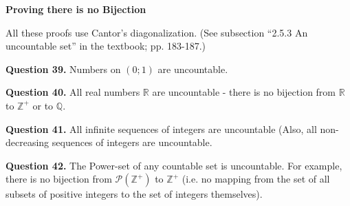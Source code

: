 \documentclass[jou]{apa6}
\begin{document}
\vspace{20pt}
{\bf Proving there is no Bijection}

All these proofs use Cantor's diagonalization. (See subsection 
``2.5.3 An uncountable set'' in the textbook; pp. 183-187.)

\vspace{6pt}
{\bf Question 39.} Numbers on $(0;1)$ are uncountable.


\vspace{6pt}
{\bf Question 40.}
 All real numbers $\mathbb{R}$ are uncountable - there 
is no bijection from $\mathbb{R}$ to $\mathbb{Z}^{+}$ or
to $\mathbb{Q}$. 


\vspace{6pt}
{\bf Question 41.} All infinite sequences of integers are uncountable
(Also, all non-decreasing sequences of integers are uncountable.


\vspace{6pt}
{\bf Question 42.} The Power-set of any countable set is 
uncountable. For example, 
there is no bijection from $\mathcal{P}(\mathbb{Z}^{+})$
to $\mathbb{Z}^{+}$ (i.e. no mapping from the set of all subsets of 
positive integers to the set of integers themselves).
\end{document}
